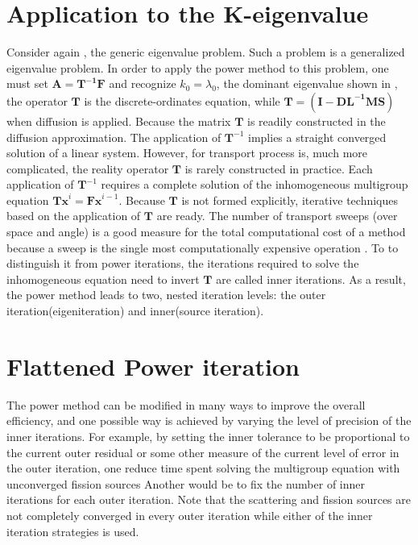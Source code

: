 \section{Application to the K-eigenvalue}

Consider again , the generic eigenvalue problem.
Such a problem is a generalized eigenvalue problem.
In order to apply the power method to this problem, one must set $\mathbf{A=T^{-1}F}$ and recognize $k_0= \lambda_0$, the dominant eigenvalue shown in , the operator $\mathbf{T}$ is the discrete-ordinates equation, while $\mathbf{T} = (\mathbf{I  - DL^{-1}MS})$ when diffusion is applied.
Because the matrix $\mathbf{T}$ is readily constructed in the diffusion approximation.
The application of $\mathbf{T}^{-1}$ implies a straight converged solution of a linear system. 
However, for transport process is, much more complicated, the reality operator $\mathbf{T}$ is rarely constructed in practice.
Each application of $\mathbf{T}^{-1}$ requires a complete solution of the inhomogeneous multigroup equation $\mathbf{Tx}^{i} = \mathbf{Fx}^{i-1}$.
Because $\mathbf{T}$ is not formed explicitly, iterative techniques based on the application of $\mathbf{T}$ are ready. 
The number of transport sweeps (over space and angle) is a good measure for the total computational cost of a method because a sweep is the single most computationally expensive operation .
To to distinguish it from power iterations, the iterations required to solve the inhomogeneous equation need to invert $\mathbf{T}$ are called inner iterations.
As a result, the power method leads to two, nested iteration levels: the outer iteration(eigeniteration) and inner(source iteration).

\section{Flattened Power iteration}

The power method can be modified in many ways to improve the overall efficiency, and one possible way is achieved by varying the level of precision of the inner iterations.
For example, by setting the inner tolerance to be proportional to the current outer residual or some other measure of the current level of error in the outer iteration, one reduce time spent solving the multigroup equation with unconverged fission sources
Another would be to fix the number of inner iterations for each outer iteration.
Note that the scattering and fission sources are not completely converged in every outer iteration while either of the inner iteration strategies is used.
\citep{gill_newtons_2011}


